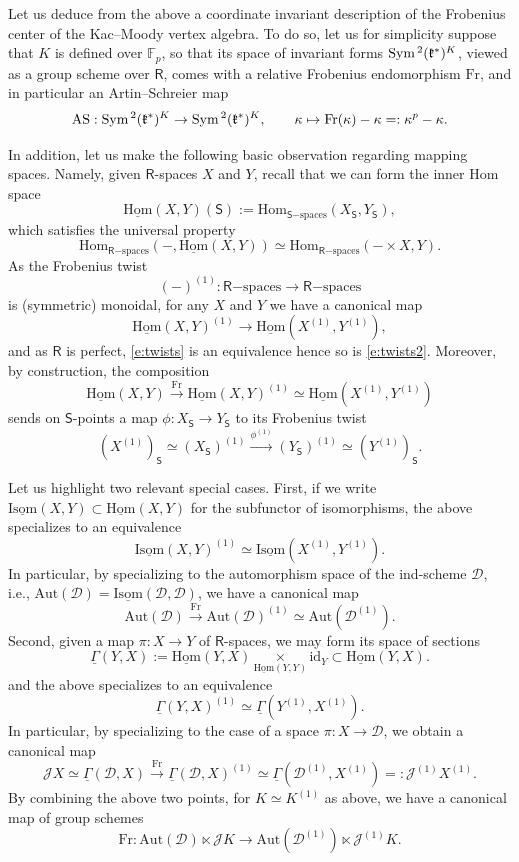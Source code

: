 \documentclass{amsart}
\theoremstyle{definition}
\newcommand{\uHom}{\underline{\on{Hom}}}
\newcommand{\fk}{\mathfrak{k}}
\newcommand{\sss}{\subsubsection{}}
\newcommand{\fr}{^\on{(1)}}
\newcommand{\sD}{\mathscr{D}}
\newcommand{\Sing}{\mathsf{S}}
\newcommand{\Hom}{\on{Hom}}
\newcommand{\Sym}{\on{Sym}\hspace{.5mm}}
\newcommand{\on}{\mathrm}
\newcommand{\Ring}{\mathsf{R}}
\newcommand{\Jet}{\mathscr{J}}
\newcommand{\Aut}{\on{Aut}}
\numberwithin{equation}{section}
\begin{document}
\sss Let us deduce from the above a coordinate invariant description of the Frobenius center of the Kac--Moody vertex algebra. To do so, let us for simplicity suppose that $K$ is defined over $\mathbb{F}_p$, so that its space of invariant forms $\Sym^2(\fk^*)^K$, viewed as a group scheme over $\Ring$, comes with a relative Frobenius endomorphism $\on{Fr}$, and in particular an Artin--Schreier map 
$$\on{AS}: \Sym^2(\fk^*)^K \rightarrow \Sym^2(\fk^*)^K, \quad \quad \kappa \mapsto \on{Fr}(\kappa) - \kappa =: \kappa^p - \kappa.$$

In addition, let us make the following basic observation regarding mapping spaces. Namely, given $\Ring$-spaces $X$ and $Y$, recall that we can form the inner Hom space 
$$\uHom(X,Y)(\Sing) := \Hom_{\Sing\on{-spaces}}(X_\Sing, Y_\Sing),$$
which satisfies the universal property 
\begin{equation*} \Hom_{\Ring\on{-spaces}}( -, \uHom(X,Y)) \simeq \Hom_{\Ring\on{-spaces}}( - \times X, Y). \end{equation*}
As the Frobenius twist \begin{equation} \label{e:twists}(-)\fr: \Ring\on{-spaces} \rightarrow \Ring\on{-spaces}\end{equation}is (symmetric) monoidal, for any $X$ and $Y$ we have a canonical map 
\begin{equation} \label{e:twists2} \uHom(X,Y)\fr \rightarrow \uHom(X\fr, Y\fr),\end{equation}
and as $\Ring$ is perfect, \eqref{e:twists} is an equivalence hence so is \eqref{e:twists2}.  Moreover, by construction, the composition 
$$\uHom(X,Y) \xrightarrow{\on{Fr}} \uHom(X,Y)\fr \simeq \uHom(X\fr, Y\fr)$$
sends on $\Sing$-points a map $\phi: X_\Sing \rightarrow Y_\Sing$ to its Frobenius twist 
$$(X\fr)_\Sing \simeq (X_\Sing)\fr \xrightarrow{\phi\fr} (Y_\Sing)\fr \simeq (Y\fr)_\Sing.$$


Let us highlight two relevant special cases. First, if we write $\underline{\on{Isom}}(X,Y) \subset \uHom(X,Y)$ for the subfunctor of isomorphisms, the above specializes to an equivalence $$\underline{\on{Isom}}(X,Y)\fr \simeq \underline{\on{Isom}}(X\fr, Y\fr).$$
In particular, by specializing to the automorphism space of the ind-scheme $\sD$, i.e.,  $\Aut(\sD) = \underline{\on{Isom}}(\sD, \sD)$, we have a canonical map 
$$\Aut(\sD) \xrightarrow{\on{Fr}} \Aut(\sD)\fr \simeq \Aut(\sD\fr).$$
Second, given a map $\pi: X \rightarrow Y$ of $\Ring$-spaces, we may form its space of sections 
$$\underline{\Gamma}(Y,X) := \uHom(Y,X) \underset{\uHom(Y,Y)}\times  \on{id}_Y  \subset \uHom(Y,X).$$
and the above specializes to an equivalence 
$$\underline{\Gamma}(Y,X)\fr \simeq \underline{\Gamma}(Y\fr, X\fr).$$
In particular, by specializing to the case of a space $\pi: X \rightarrow \sD$, we obtain a canonical map 
$$\Jet X \simeq \underline{\Gamma}(\sD, X) \xrightarrow{\on{Fr}} \underline{\Gamma}(\sD, X)\fr \simeq \underline{\Gamma}(\sD\fr, X\fr) =: \Jet\fr X\fr.$$
By combining the above two points, for $K \simeq K\fr$ as above, we have a canonical map of group schemes 
$$\on{Fr}: \Aut(\sD) \ltimes \Jet K \rightarrow \Aut(\sD\fr) \ltimes \Jet\fr K.$$
\end{document}
